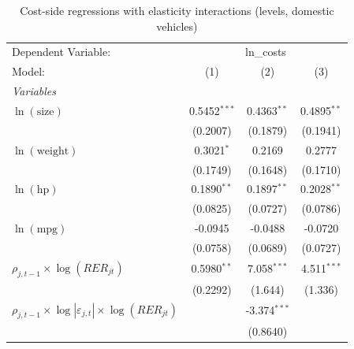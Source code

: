 
\begin{table}[htbp]
   \caption{\label{tab:cost_reg_elas_levels} Cost-side regressions with elasticity interactions (levels, domestic vehicles)}
   \centering
   \begin{tabular}{lccc}
      \tabularnewline \midrule \midrule
      Dependent Variable: & \multicolumn{3}{c}{ln\_costs}\\
      Model:                                                                  & (1)            & (2)            & (3)\\
      \midrule
      \emph{Variables}\\
      $\ln(\text{size})$                                                      & 0.5452$^{***}$ & 0.4363$^{**}$  & 0.4895$^{**}$\\
                                                                              & (0.2007)       & (0.1879)       & (0.1941)\\
      $\ln(\text{weight})$                                                    & 0.3021$^{*}$   & 0.2169         & 0.2777\\
                                                                              & (0.1749)       & (0.1648)       & (0.1710)\\
      $\ln(\text{hp})$                                                        & 0.1890$^{**}$  & 0.1897$^{**}$  & 0.2028$^{**}$\\
                                                                              & (0.0825)       & (0.0727)       & (0.0786)\\
      $\ln(\text{mpg})$                                                       & -0.0945        & -0.0488        & -0.0720\\
                                                                              & (0.0758)       & (0.0689)       & (0.0727)\\
      $\rho_{j,t-1}\times\log(RER_{jt})$                                      & 0.5980$^{**}$  & 7.058$^{***}$  & 4.511$^{***}$\\
                                                                              & (0.2292)       & (1.644)        & (1.336)\\
      $\rho_{j,t-1}\times\log|\varepsilon_{j,t}|\times\log(RER_{jt})$         &                & -3.374$^{***}$ &   \\
                                                                              &                & (0.8640)       &   \\

\end{tabular}
\end{table}
